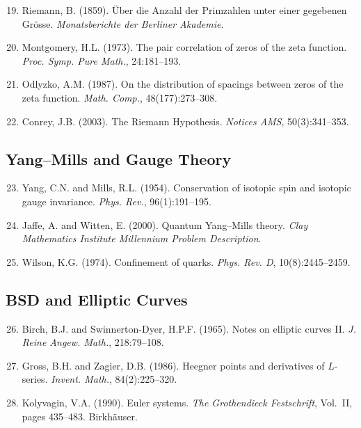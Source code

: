 \documentclass[12pt, openany]{book}
\theoremstyle{remark}
\begin{document}
\begin{enumerate}\setcounter{enumi}{18}

\item Riemann, B. (1859). \"Uber die Anzahl der Primzahlen unter einer
      gegebenen Gr\"osse. \emph{Monatsberichte der Berliner Akademie}.

\item Montgomery, H.L. (1973). The pair correlation of zeros of the zeta
      function. \emph{Proc. Symp. Pure Math.}, 24:181--193.

\item Odlyzko, A.M. (1987). On the distribution of spacings between zeros of
      the zeta function. \emph{Math. Comp.}, 48(177):273--308.

\item Conrey, J.B. (2003). The Riemann Hypothesis. \emph{Notices AMS},
      50(3):341--353.

\end{enumerate}

\subsection*{Yang--Mills and Gauge Theory}

\begin{enumerate}\setcounter{enumi}{22}

\item Yang, C.N. and Mills, R.L. (1954). Conservation of isotopic spin and
      isotopic gauge invariance. \emph{Phys. Rev.}, 96(1):191--195.

\item Jaffe, A. and Witten, E. (2000). Quantum Yang--Mills theory.
      \emph{Clay Mathematics Institute Millennium Problem Description}.

\item Wilson, K.G. (1974). Confinement of quarks. \emph{Phys. Rev. D},
      10(8):2445--2459.

\end{enumerate}

\subsection*{BSD and Elliptic Curves}

\begin{enumerate}\setcounter{enumi}{25}

\item Birch, B.J. and Swinnerton-Dyer, H.P.F. (1965). Notes on elliptic curves
      II. \emph{J. Reine Angew. Math.}, 218:79--108.

\item Gross, B.H. and Zagier, D.B. (1986). Heegner points and derivatives of
      $L$-series. \emph{Invent. Math.}, 84(2):225--320.

\item Kolyvagin, V.A. (1990). Euler systems. \emph{The Grothendieck Festschrift},
      Vol.~II, pages 435--483. Birkh\"auser.

\end{enumerate}
\end{document}
